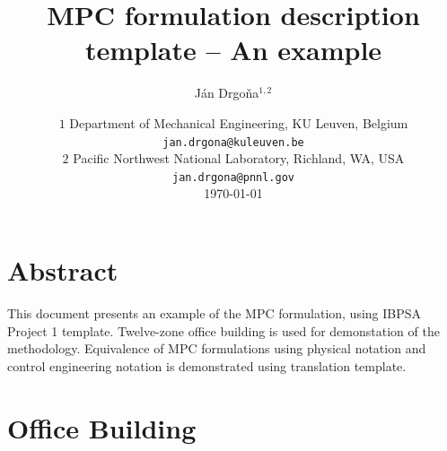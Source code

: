 \documentclass[10pt]{article}
\title{MPC formulation description template -- An example}
\author{J\'an Drgo\v{n}a$^{1,2}$}
\date{ ${1}$ Department of Mechanical Engineering,  KU Leuven, Belgium \\
        {\tt\small jan.drgona@kuleuven.be}  \\
            {${2}$ Pacific Northwest National Laboratory, Richland, WA, USA \\
        {\tt\small jan.drgona@pnnl.gov}} \\%
        \vspace{0.2cm}
    \today
}
\begin{document}
	
% 
% 
% 


\maketitle
\thispagestyle{empty}
\pagestyle{empty}

\section*{Abstract}

This document presents an example of the MPC formulation, using IBPSA Project 1 template.
Twelve-zone office building is used for demonstation of the methodology.
Equivalence of MPC formulations using physical notation and control engineering notation is demonstrated using translation template.



\section{Office Building} \label{sec:building}
\end{document}
